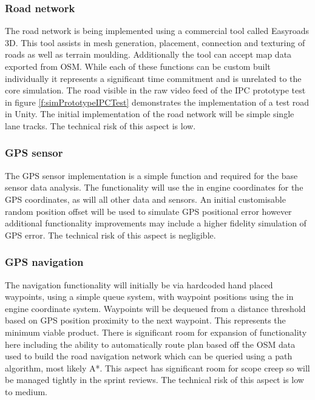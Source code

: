 \documentclass[]{aiaa-tc}%
\begin{document}
\subsubsection{Road network}

The road network is being implemented using a commercial tool called Easyroads 3D. This tool assists in mesh generation, placement, connection and texturing of roads as well as terrain moulding. Additionally the tool can accept map data exported from OSM. While each of these functions can be custom built individually it represents a significant time commitment and is unrelated to the core simulation. The road visible in the raw video feed of the IPC prototype test in figure \ref{f:simPrototypeIPCTest} demonstrates the implementation of a test road in Unity. The initial implementation of the road network will be simple single lane tracks. The technical risk of this aspect is low.

\subsubsection{GPS sensor}

The GPS sensor implementation is a simple function and required for the base sensor data analysis. The functionality will use the in engine coordinates for the GPS coordinates, as will all other data and sensors. An initial customisable random position offset will be used to simulate GPS positional error however additional functionality improvements may include a higher fidelity simulation of GPS error. The technical risk of this aspect is negligible.

\subsubsection{GPS navigation}\label{s:gpsNavSim}

The navigation functionality will initially be via hardcoded hand placed waypoints, using a simple queue system, with waypoint positions using the in engine coordinate system. Waypoints will be dequeued from a distance threshold based on GPS position proximity to the next waypoint. This represents the minimum viable product. There is significant room for expansion of functionality here including the ability to automatically route plan based off the OSM data used to build the road navigation network which can be queried using a path algorithm, most likely A*. This aspect has significant room for scope creep so will be managed tightly in the sprint reviews. The technical risk of this aspect is low to medium.
\end{document}
